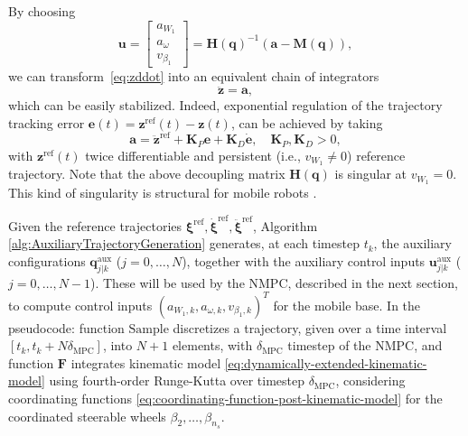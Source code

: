 By choosing
\begin{equation*}
    \bm{u} = \begin{bmatrix}
        a_{W_1} \\ a_{\omega} \\ v_{\beta_1}
    \end{bmatrix}
    = \bm{H}(\bm{q})^{-1} \left(\bm{a} - \bm{M}(\bm{q})\right),
\end{equation*}
we can transform~\eqref{eq:zddot} into an equivalent chain of integrators
\begin{equation*}
    \ddot{\bm{z}} = \bm{a},
\end{equation*}
which can be easily stabilized. Indeed, exponential regulation of the trajectory
tracking error $\bm{e}(t) = \bm{z}^{\mathrm{ref}}(t)-\bm{z}(t)$, can be
achieved by taking
\begin{equation*}
    \bm{a} = \ddot{\bm{z}}^{\mathrm{ref}} + \bm{K}_P \bm{e} + \bm{K}_D \dot{\bm{e}}, \quad \bm{K}_P, \bm{K}_D > 0,
\end{equation*}
with $\bm{z}^{\mathrm{ref}}(t)$ twice differentiable and persistent
(i.e., $v_{W_1} \ne 0$) reference trajectory. Note that the above decoupling
matrix $\bm{H}(\bm{q})$ is singular at $v_{W_1} = 0$. This kind of singularity
is structural for mobile robots \cite{Oriolo2002WMRControlDFL}.

Given the reference trajectories
$\bm{\xi}^{\mathrm{ref}}, \dot{\bm{\xi}}^{\mathrm{ref}}, \ddot{\bm{\xi}}^{\mathrm{ref}}$,
Algorithm \ref{alg:AuxiliaryTrajectoryGeneration} generates, at each timestep
$t_k$, the auxiliary configurations $\bm{q}_{j|k}^{\mathrm{aux}}$ ($j = 0, \dots, N$),
together with the auxiliary control inputs
$\bm{u}_{j|k}^{\mathrm{aux}}$ ($j = 0, \dots, N-1$). These will be used by the
NMPC, described in the next section, to compute control inputs
$(a_{W_1, k}, a_{\omega, k}, v_{\beta_1, k})^T$ for the mobile base.
In the pseudocode: function $\mathrm{Sample}$ discretizes a trajectory,
given over a time interval $[t_k, t_{k} + N \delta_{\mathrm{MPC}}]$, into
$N + 1$ elements, with $\delta_{\mathrm{MPC}}$ timestep of the NMPC, and
function $\bm{F}$ integrates kinematic model
\eqref{eq:dynamically-extended-kinematic-model} using fourth-order Runge-Kutta
over timestep $\delta_{\mathrm{MPC}}$, considering coordinating functions
\eqref{eq:coordinating-function-post-kinematic-model} for the coordinated
steerable wheels $\beta_2, \dots, \beta_{n_s}$.

